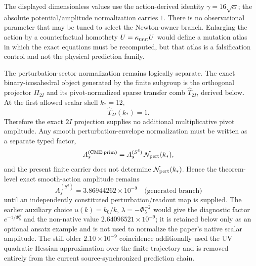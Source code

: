 \documentclass[12pt,a4paper]{article}
\begin{document}
The displayed dimensionless values use the action-derived identity
\(\gamma=16\sqrt\alpha\); the absolute potential/amplitude normalization carries
\(1\).  There is no observational parameter that may be tuned to
select the Newton-owner branch.  Enlarging the action by a
counterfactual homothety \(U=\kappa_{\rm mut}U\) would define a mutation
atlas in which the exact equations must be recomputed, but that atlas is a
falsification control and not the physical prediction family.

The perturbation-sector normalization remains logically separate.  The exact
binary-icosahedral object generated by the finite subgroup is the orthogonal
projector \(\Pi_{2I}\) and its pivot-normalized sparse transfer comb
\(\widehat T_{2I}\), derived below.  At the first allowed scalar shell
\(k_*=12\),
\begin{equation}
\label{p8:eq:As-obs-deferred}
\widehat T_{2I}(k_*)=1.
\end{equation}
Therefore the exact \(2I\) projection supplies no additional multiplicative
pivot amplitude.  Any smooth perturbation-envelope normalization must be
written as a separate typed factor,
\begin{equation}
\label{p8:eq:As-perturbation-interface}
A_s^{(\mathrm{CMB\,prim})}
=A_s^{(S^3)}\,\mathcal N_{\rm pert}(k_*),
\end{equation}
and the present finite carrier does not determine
\(\mathcal N_{\rm pert}(k_*)\).  Hence the theorem-level exact smooth-action
amplitude remains
\begin{equation}
\label{p8:eq:As-proj-current}
\boxed{A_s^{(S^3)}=3.86944262\times10^{-9}\quad
\text{(generated branch)}}
\end{equation}
until an independently constituted perturbation/readout map is supplied.
The earlier auxiliary choice
\(u(k)=k_0/k\), \(\lambda=-\Phi_5^{-2}\) would give the diagnostic factor
\(e^{-1/\Phi_5^2}\) and the non-native value
\(2.64096521\times10^{-9}\); it is retained below only as an optional ansatz
example and is not used to normalize the paper's native scalar amplitude.
The still older \(2.10\times10^{-9}\) coincidence additionally used the UV
quadratic Hessian approximation over the finite trajectory and is removed entirely from
the current source-synchronized prediction chain.
\end{document}
